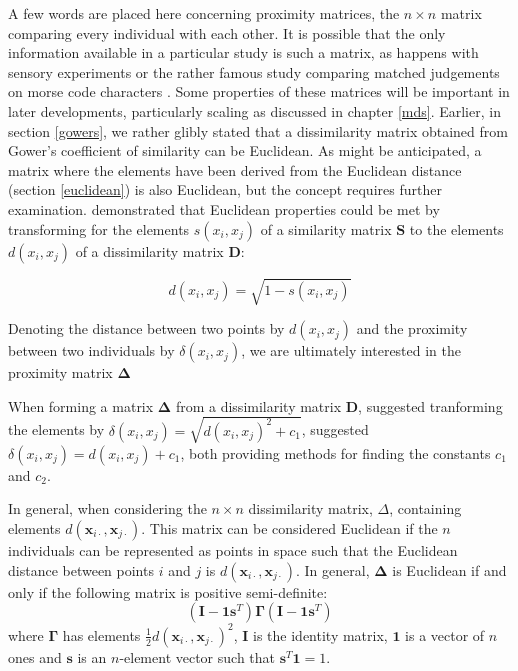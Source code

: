 A few words are placed here concerning proximity matrices, the $n \times n$ matrix comparing every individual with each other.   It is possible that the only information available in a particular study is such a matrix, as happens with sensory experiments or the rather famous study comparing matched judgements on morse code characters \citep{Rothkopf:1957}.  Some properties of these matrices will be important in later developments, particularly scaling as discussed in chapter \ref{mds}.   Earlier, in section \ref{gowers}, we rather glibly stated that a dissimilarity matrix obtained from Gower's coefficient of similarity can be Euclidean.   As might be anticipated, a matrix where the elements have been derived from the Euclidean distance (section \ref{euclidean}) is also Euclidean, but the concept requires further examination.   \cite{Gower:1966} demonstrated that Euclidean properties could be met by transforming for the elements $s(x_{i},x_{j})$ of a similarity matrix $\boldsymbol{S}$ to the elements $d(x_{i},x_{j})$ of a dissimilarity matrix $\boldsymbol{D}$:

\begin{displaymath}
d(x_{i},x_{j}) = \sqrt{1 - s(x_{i},x_{j})}
\end{displaymath}

Denoting the distance between two points by $d(x_{i},x_{j})$ and the proximity between two individuals by $\delta(x_{i},x_{j})$, we are ultimately interested in the proximity matrix $\boldsymbol{\Delta}$

When forming a  matrix $\boldsymbol{\Delta}$ from a dissimilarity matrix $\boldsymbol{D}$, \cite{Lingoes:1971} suggested tranforming the elements by $\delta(x_{i},x_{j}) = \sqrt{d(x_{i},x_{j})^{2} + c_{1}}$, \cite{Cailliez:1983} suggested  $\delta(x_{i},x_{j}) = d(x_{i},x_{j}) + c_{1}$, both providing methods for finding the constants $c_{1}$ and $c_{2}$.  



In general, when considering the $n \times n$ dissimilarity matrix, $\Delta$, containing elements $d(\boldsymbol{x}_{i\cdot}, \boldsymbol{x}_{j\cdot})$.   This matrix can be considered Euclidean if the $n$ individuals can be represented as points in space such that the Euclidean distance between points $i$ and $j$ is $d(\boldsymbol{x}_{i\cdot}, \boldsymbol{x}_{j\cdot})$.   In general, $\boldsymbol{\Delta}$ is Euclidean if and only if the following matrix is positive semi-definite:
\begin{displaymath}
(\boldsymbol{I} - \boldsymbol{1}\boldsymbol{s}^{T}) \boldsymbol{\Gamma} (\boldsymbol{I} - \boldsymbol{1}\boldsymbol{s}^{T})
\end{displaymath}
where  $\boldsymbol{\Gamma}$ has elements $\frac{1}{2}d(\boldsymbol{x}_{i\cdot}, \boldsymbol{x}_{j\cdot})^{2}$, $\boldsymbol{I}$ is the identity matrix, $\boldsymbol{1}$ is a vector of $n$ ones and $\boldsymbol{s}$ is an $n$-element vector such that $\boldsymbol{s}^{T}\boldsymbol{1} = 1$.   

